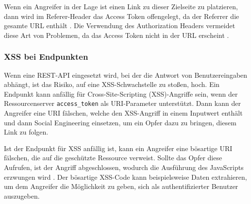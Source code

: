 
Wenn ein Angreifer in der Lage ist einen Link zu dieser Zielseite zu platzieren, dann wird im Referer-Header das Access Token offengelegt, da der Referrer die gesamte URL enthält  \cite{SSEB_OAuth2inAction}. Die Verwendung des Authorization Headers vermeidet diese Art von Problemen, da das Access Token nicht in der URL erscheint \cite{SSEB_OAuth2inAction}.


\subsubsection{XSS bei Endpunkten}

Wenn eine REST-API eingesetzt wird, bei der die Antwort von Benutzereingaben abhängt, ist das Risiko, auf eine XSS-Schwachstelle zu stoßen, hoch. Ein Endpunkt kann anfällig für Cross-Site-Scripting (XSS)-Angriffe sein, wenn der Ressourcenserver \texttt{access\_token} als URI-Parameter unterstützt. Dann kann der Angreifer eine URI fälschen, welche den XSS-Angriff in einem Inputwert enthält und dann Social Engineering einsetzen, um ein Opfer dazu zu bringen, diesem Link zu folgen. \cite{SSEB_OAuth2inAction}

Ist der Endpunkt für XSS anfällig ist, kann ein Angreifer eine bösartige URI fälschen, die auf die geschützte Ressource verweist. Sollte das Opfer diese Aufrufen, ist der Angriff abgeschlossen, wodurch die Ausführung des JavaScripts erzwungen wird \cite{SSEB_OAuth2inAction}. Der bösartige XSS-Code kann beispielsweise Daten extrahieren, um dem Angreifer die Möglichkeit zu geben, sich als authentifizierter Benutzer auszugeben. 

